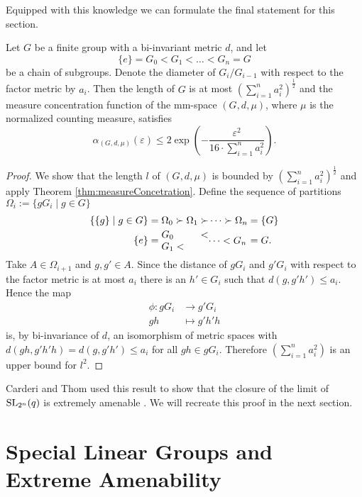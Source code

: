 Equipped with this knowledge we can formulate the final statement for this section. 
\begin{corollary}\label{cor:meaContractionGroups}
Let $G$ be a finite group with a bi-invariant metric $d$, and let
\[\{e\}=G_0<G_1<\dots <G_n=G\]
be a chain of subgroups. Denote the diameter of $G_i/G_{i-1}$ with respect to the factor metric by $a_i$. Then the length of $G$ is at most $\left(\sum_{i=1}^{n}a_i^2\right)^{\frac{1}{2}}$ and the measure concentration function of the mm-space $(G,d,\mu)$, where $\mu$ is the normalized counting measure, satisfies
\[\alpha_{(G,d,\mu)}(\varepsilon)\leq 2\exp\left(-\frac{\varepsilon^2}{16\cdot\sum_{i=1}^{n}a_i^2}\right).\]
\end{corollary}
\begin{proof}
We show that the length $l$ of $(G,d,\mu)$ is bounded by $\left(\sum_{i=1}^{n}a_i^2\right)^{\frac{1}{2}}$ and apply Theorem \ref{thm:measureConcetration}. Define the sequence of partitions $\Omega_i:=\{g G_i\mid g\in G\}$
\begin{align*}
\{\{g\}\mid g\in G\}=\Omega_0\succ\Omega_1\succ&\dots\succ\Omega_n=\{G\}\\
\{e\}=\parbox{\widthof{$\Omega_0\succ\Omega_1\succ$}}{$G_0<G_1<$}&\parbox{\widthof{${}\dots\succ\Omega_n$}}{$\dots <G_n$}=G.
\end{align*}
Take $A\in \Omega_{i+1}$ and $g,g'\in A$. Since the distance of $gG_i$ and $g'G_i$ with respect to the factor metric is at most $a_i$ there is an $h'\in G_i$ such that $d(g,g'h')\leq a_i$. Hence the map 
\begin{align*}
\phi\colon g G_i&{}\to g'G_i\\
gh&{}\mapsto g'h'h
\end{align*}
is, by bi-invariance of $d$, an isomorphism of metric spaces with $d(gh,g'h'h)=d(g,g'h')\leq a_i$ for all $gh\in gG_i$.
Therefore $\left(\sum_{i=1}^{n}a_i^2\right)$ is an upper bound for $l^2$. 
\end{proof}
Carderi and Thom used this result to show that the closure of the limit of $\operatorname{SL}_{2^n}(q)$ is extremely amenable \cite{thom}. We will recreate this proof in the next section. 


\section{Special Linear Groups and Extreme Amenability}\label{sec:thom}

